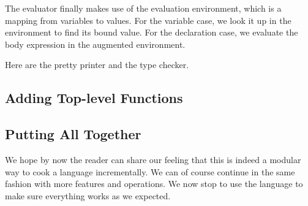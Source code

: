 The evaluator finally makes use of the evaluation environment, which is a
mapping from variables to values.
For the variable case, we look it up in the environment to find its bound value.
For the declaration case, we evaluate the body expression in the augmented
environment.

Here are the pretty printer and the type checker.


\subsection{Adding Top-level Functions}


\subsection{Putting All Together}

We hope by now the reader can share our feeling that this is indeed a modular
way to cook a language incrementally. We can of course continue in the same
fashion with more features and operations. We now stop to use the language to
make sure everything works as we expected.




